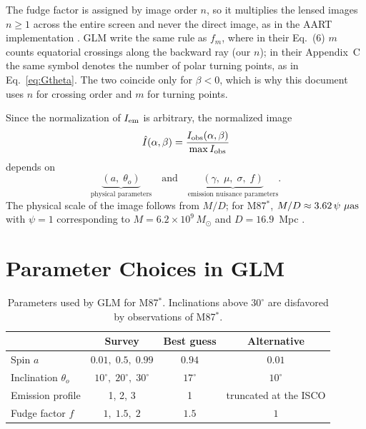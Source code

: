 \documentclass[11pt]{article}
\begin{document}
The fudge factor is assigned by image order $n$, so it multiplies the lensed
images $n \ge 1$ across the entire screen and never the direct image, as in
the AART implementation \cite{AART2023}. GLM write the same rule as $f_m$,
where in their Eq.~(6) $m$ counts equatorial crossings along the backward ray
(our $n$); in their Appendix~C the same symbol denotes the number of polar
turning points, as in Eq.~\eqref{eq:Gtheta}. The two coincide only for
$\beta < 0$, which is why this document uses $n$ for crossing order and $m$
for turning points.

Since the normalization of $I_{\rm em}$ is arbitrary, the normalized image
\begin{equation}
\hat I(\alpha,\beta) = \frac{I_{\rm obs}(\alpha,\beta)}{\max I_{\rm obs}}
\end{equation}
depends on
\begin{equation}
\underbrace{(a,\;\theta_o)}_{\text{physical parameters}}
\quad\text{and}\quad
\underbrace{(\gamma,\;\mu,\;\sigma,\;f)}_{\text{emission nuisance parameters}}.
\end{equation}
The physical scale of the image follows from $M/D$; for M87$^*$,
$M/D \approx 3.62\,\psi~\mu{\rm as}$ with $\psi = 1$ corresponding to
$M = 6.2\times10^9\,M_\odot$ and $D = 16.9$~Mpc \cite{GLM2020}.

\section{Parameter Choices in GLM}

\begin{table}[h]
\centering
\begin{tabular}{lccc}
\toprule
 & Survey & Best guess & Alternative \\
\midrule
Spin $a$             & $0.01,\;0.5,\;0.99$       & $0.94$ & $0.01$ \\
Inclination $\theta_o$ & $10^\circ,\;20^\circ,\;30^\circ$ & $17^\circ$ & $10^\circ$ \\
Emission profile     & 1, 2, 3                   & 1      & truncated at the ISCO \\
Fudge factor $f$     & $1,\;1.5,\;2$             & $1.5$  & $1$ \\
\bottomrule
\end{tabular}
\caption{Parameters used by GLM for M87$^*$. Inclinations above $30^\circ$
are disfavored by observations of M87$^*$.}
\end{table}
\end{document}
